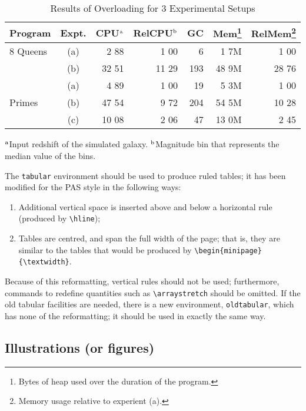 \documentclass{pas}
\begin{document}
\begin{table}[b!]
 \caption{Results of Overloading for 3 Experimental Setups}\label{sample-table}
 {\tablefont\begin{tabular}{@{\extracolsep{\fill}}lcrrrrr}
   \toprule
    Program& Expt.&
     CPU$^{\rm a}$& RelCPU$^{\rm b}$&
     GC& Mem\footnote{Bytes of heap used over the duration of the program.}&
     RelMem\footnote{Memory usage relative to experient (a).}\\
     \hline
    8 Queens& (a)&   2 88&  1 00&    6&   1 7M&  1 00\\
    &         (b)&  32 51& 11 29&  193&  48 9M& 28 76\\
    \multirow{4}{*}[3pt]{Primes}&   (a)&   4 89&  1 00&   19&   5 3M&  1 00\\
    &         (b)&  47 54&  9 72&  204&  54 5M& 10 28\\
    &         (c)&  10 08&  2 06&   47&  13 0M&  2 45
   \botrule
    \end{tabular}}
    \begin{tabnote}
    {$^{{\rm a}}$Input redshift of the simulated galaxy.}\tnp
    {$^{{\rm b}}$Magnitude bin that represents the median value of the bins.}\tnp
    \end{tabnote}
\end{table}

The \verb"tabular" environment should be used to produce ruled tables;
it has been modified for the PAS style in the following ways:
\begin{enumerate}
  \item Additional vertical space is inserted above and below a horizontal rule
        (produced by \verb"\hline");
  \item Tables are centred, and span the full width of the page; that is,
  they are similar to the tables that would be produced by
  \verb"\begin{minipage}" \verb"{\textwidth}".
\end{enumerate}
Because of this reformatting, vertical rules should not be used;
furthermore, commands to
redefine quantities such as \verb"\arraystretch" should be omitted. If
the old tabular facilities are needed, there is a new environment,
\verb"oldtabular", which has none of the reformatting; it should be used
in exactly the same way.

\subsection{Illustrations (or figures)}
\end{document}
